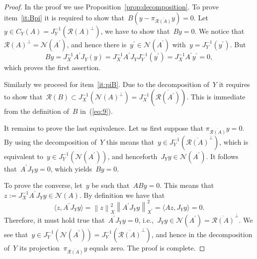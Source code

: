 \documentclass[10pt,a4paper]{amsart}
\newcommand{\N}{\mathcal N}
\newcommand{\lr}[1]{\left(#1\right)}
\newcommand{\norm}[2]{\left\|#1\right\|_{#2}}
\newcommand{\pr}{\pi_{\overline{\range(A)}}}
\newcommand{\range}{\mathcal R}
\newcommand{\scalar}[2]{\langle{ #1},{#2} \rangle}
\begin{document}
\begin{proof}
  In the proof we use Proposition~\ref{prop:decomposition}.
  To prove item~\eqref{it:Bpi} it is required to show that~$B\lr{y -
    \pi_{\overline{\range(A)}}y} = 0$. Let $y\in C_Y(A)=
  J_{Y}^{-1}\lr{\range(A)^{\perp}}$,  we have to show that~$B y=0$.
 We notice that~$\range(A)^{\perp} = \N(A^{\prime})$, and hence there
  is~$y^{\prime}\in \N(A^{\prime})$ with~$y= J_{Y}^{-1}(y^{\prime})$.
  But
  $$
 B y = J_{X}^{-1} A^{\prime} J_{Y}(y) = J_{X}^{-1}
 A^{\prime} J_{Y}J_{Y}^{-1}(y^{\prime}) = J_{X}^{-1} A^{\prime}y^{\prime}= 0,
 $$
 which proves the first assertion.
 \par
 Similarly we proceed for item~\eqref{it:piB}. Due to the
 decomposition of~$Y$ it requires to show that~$\range(B)\subset
 J_{X}^{-1}\lr{\N(A)^{\perp}} =
 J_{X}^{-1}\lr{\overline{\range(A^{\prime})}}$.
 This is immediate from the definition of~$B$ in~(\ref{eq:9}).
 \par
 It remains to prove the last equivalence.
 Let us first suppose that \newline $\pr y =0$. By using the decomposition of~$Y$ this
 means that~$y \in J_{Y}^{-1}\lr{\overline{\range(A)}^{\perp}}$, which is
 equivalent to~$y\in J_{Y}^{-1}\lr{\N(A^{\prime})}$, and
 henceforth~$J_{Y}y \in \N(A^{\prime})$. It follows
 that~$A^{\prime}J_{Y}y=0$, which yields~$By=0$.
 \par
 To prove the converse, let~$y$ be such that~$ABy=0$. This means
 that~$z:= J_{X}^{-1}A^{\prime}J_{Y}y \in\N(A)$. By definition we have
 that
 $$
\scalar{z }{A^{\prime}J_{Y}y} = \norm{z}{X}^{2}
\norm{A^{\prime}J_{Y}y}{X^{\prime}}^{2} = \scalar{ A z }{J_{Y}y} =0.
$$
Therefore, it must hold true that~$A^{\prime}J_{Y}y=0$, i.e.,\
$J_{Y}y\in \N(A^{\prime}) = \overline{\range(A)}^{\perp}$. We see
that~$y\in J_{Y}^{-1}\lr{\N(A^{\prime})}=J_{Y}^{-1}\lr{
  \overline{\range(A)}^{\perp}} $, and hence in the decomposition
of~$Y$ its projection~$\pr y$ equals zero. The proof is complete.
\end{proof}
\end{document}
